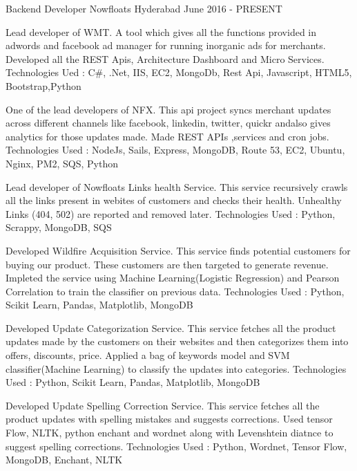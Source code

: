 

\begin{cventries}

  \cventry
    {Backend Developer} %
    {Nowfloats} %
    {Hyderabad} %
    {June 2016 - PRESENT} %
    {
      \begin{cvitems} %
        \item {Lead developer of WMT. A tool which gives all the functions provided in adwords and facebook ad manager for running inorganic ads for merchants. Developed all the REST Apis, Architecture Dashboard and Micro Services. Technologies Ued : C\#, .Net, IIS, EC2, MongoDb, Rest Api, Javascript, HTML5, Bootstrap,Python}
        \item {One of the lead developers of NFX. This api project syncs merchant updates across different channels like facebook, linkedin, twitter, quickr andalso gives analytics for those updates made. Made REST APIs ,services and cron jobs. Technologies Used : NodeJs, Sails, Express, MongoDB, Route 53, EC2, Ubuntu, Nginx, PM2, SQS, Python}
        \item {Lead developer of Nowfloats Links health Service. This service recursively crawls all the links present in webites of customers and checks their health. Unhealthy Links (404, 502) are reported and removed later. Technologies Used : Python, Scrappy, MongoDB, SQS  }
        \item {Developed Wildfire Acquisition Service. This service finds potential customers for buying our product. These customers are then targeted to generate revenue. Impleted the service using Machine Learning(Logistic Regression) and Pearson Correlation to train the classifier on previous data. Technologies Used : Python, Scikit Learn, Pandas, Matplotlib, MongoDB  }
        \item {Developed Update Categorization Service. This service fetches all the product updates made by the customers on their websites and then categorizes them into offers, discounts, price. Applied a bag of keywords model and SVM classifier(Machine Learning) to classify the updates into categories. Technologies Used : Python, Scikit Learn, Pandas, Matplotlib, MongoDB  }
        \item {Developed Update Spelling Correction Service. This service fetches all the product updates with spelling mistakes and suggests corrections. Used tensor Flow, NLTK, python enchant and wordnet along with Levenshtein diatnce to suggest spelling corrections. Technologies Used : Python, Wordnet, Tensor Flow, MongoDB, Enchant, NLTK  }
      \end{cvitems}
    }



\end{cventries}
